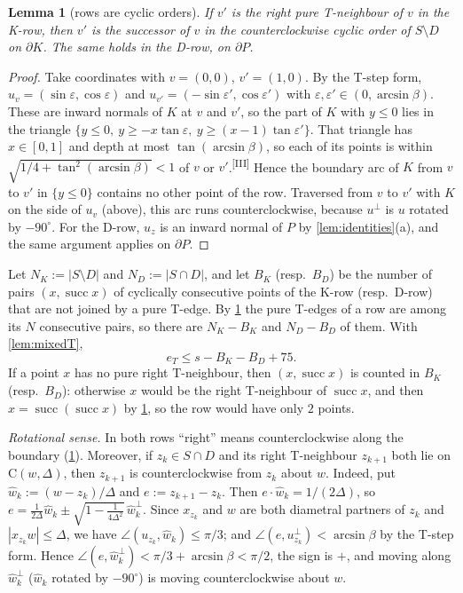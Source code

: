 \documentclass[11pt]{amsart}
\newtheorem{lemma}[theorem]{Lemma}
\theoremstyle{definition}
\theoremstyle{remark}
\newcommand{\eps}{\varepsilon}
\newcommand{\Cc}{\mathrm{C}}      %
\newcommand{\chk}[1]{\textsuperscript{[#1]}}
\begin{document}
\begin{lemma}[rows are cyclic orders]\label{lem:cyclic}
If $v'$ is the right pure T-neighbour of $v$ in the K-row, then $v'$ is the successor of $v$ in the counterclockwise cyclic order of $S\setminus D$ on $\partial K$. The same holds in the D-row, on $\partial P$.
\end{lemma}
\begin{proof}
Take coordinates with $v=(0,0)$, $v'=(1,0)$. By the T-step form, $u_v=(\sin\eps,\cos\eps)$ and $u_{v'}=(-\sin\eps',\cos\eps')$ with $\eps,\eps'\in(0,\arcsin\beta)$. These are inward normals of $K$ at $v$ and $v'$, so the part of $K$ with $y\le0$ lies in the triangle $\{y\le0,\ y\ge-x\tan\eps,\ y\ge(x-1)\tan\eps'\}$. That triangle has $x\in[0,1]$ and depth at most $\tan(\arcsin\beta)$, so each of its points is within $\sqrt{1/4+\tan^2(\arcsin\beta)}<1$ of $v$ or $v'$.\chk{III} Hence the boundary arc of $K$ from $v$ to $v'$ in $\{y\le0\}$ contains no other point of the row. Traversed from $v$ to $v'$ with $K$ on the side of $u_v$ (above), this arc runs counterclockwise, because $u^\perp$ is $u$ rotated by $-90^\circ$. For the D-row, $u_z$ is an inward normal of $P$ by \cref{lem:identities}(a), and the same argument applies on $\partial P$.
\end{proof}

Let $N_K:=|S\setminus D|$ and $N_D:=|S\cap D|$, and let $B_K$ (resp.\ $B_D$) be the number of pairs $(x,\operatorname{succ}x)$ of cyclically consecutive points of the K-row (resp.\ D-row) that are not joined by a pure T-edge. By \cref{lem:cyclic} the pure T-edges of a row are among its $N$ consecutive pairs, so there are $N_K-B_K$ and $N_D-B_D$ of them. With \cref{lem:mixedT},
\begin{equation}\label{eq:eTbreaks}
e_T\le s-B_K-B_D+75.
\end{equation}
If a point $x$ has no pure right T-neighbour, then $(x,\operatorname{succ}x)$ is counted in $B_K$ (resp.\ $B_D$): otherwise $x$ would be the right T-neighbour of $\operatorname{succ}x$, and then $x=\operatorname{succ}(\operatorname{succ}x)$ by \cref{lem:cyclic}, so the row would have only $2$ points.

\emph{Rotational sense.} In both rows ``right'' means counterclockwise along the boundary (\cref{lem:cyclic}). Moreover, if $z_k\in S\cap D$ and its right T-neighbour $z_{k+1}$ both lie on $\Cc(w,\Delta)$, then $z_{k+1}$ is counterclockwise from $z_k$ about $w$. Indeed, put $\hat w_k:=(w-z_k)/\Delta$ and $e:=z_{k+1}-z_k$. Then $e\cdot\hat w_k=1/(2\Delta)$, so $e=\frac1{2\Delta}\hat w_k\pm\sqrt{1-\frac1{4\Delta^2}}\,\hat w_k^\perp$. Since $x_{z_k}$ and $w$ are both diametral partners of $z_k$ and $|x_{z_k}w|\le\Delta$, we have $\angle(u_{z_k},\hat w_k)\le\pi/3$; and $\angle(e,u_{z_k}^\perp)<\arcsin\beta$ by the T-step form. Hence $\angle(e,\hat w_k^\perp)<\pi/3+\arcsin\beta<\pi/2$, the sign is $+$, and moving along $\hat w_k^\perp$ ($\hat w_k$ rotated by $-90^\circ$) is moving counterclockwise about $w$.
\end{document}
